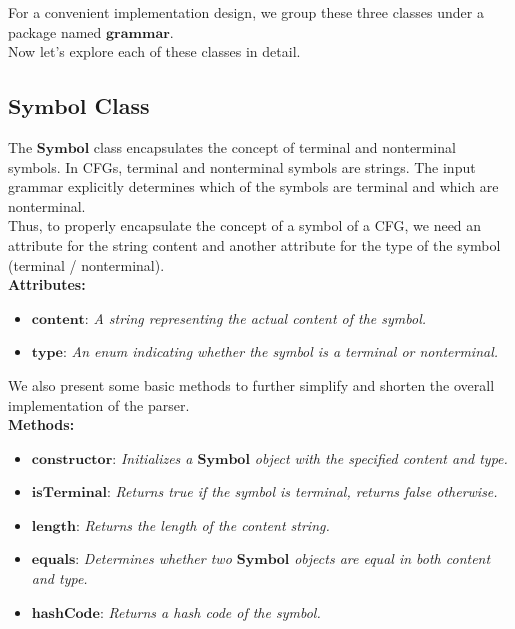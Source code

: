For a convenient implementation design, we group these three classes under a package named \(\boldsymbol{grammar}\).\\

Now let’s explore each of these classes in detail.

\subsection*{\(\boldsymbol{Symbol}\) Class}

The \(\boldsymbol{Symbol}\) class encapsulates the concept of terminal and nonterminal symbols. In CFGs, terminal and nonterminal symbols are strings. The input grammar explicitly determines which of the symbols are terminal and which are nonterminal.\\
Thus, to properly encapsulate the concept of a symbol of a CFG, we need an attribute for the string content and another attribute for the type of the symbol (terminal / nonterminal).\\

\textbf{Attributes:}
\begin{itemize}
    \item \(\boldsymbol{content}\): \textit{A string representing the actual content of the symbol.}
    \item \(\boldsymbol{type}\): \textit{An enum indicating whether the symbol is a terminal or nonterminal.}
\end{itemize}

We also present some basic methods to further simplify and shorten the overall implementation of the parser.\\

\textbf{Methods:}
\begin{itemize}
    \item \(\boldsymbol{constructor}\): \textit{Initializes a \(\boldsymbol{Symbol}\) object with the specified content and type.}
    \item \(\boldsymbol{isTerminal}\): \textit{Returns true if the symbol is terminal, returns false otherwise.}
    \item \(\boldsymbol{length}\): \textit{Returns the length of the content string.}
    \item \(\boldsymbol{equals}\): \textit{Determines whether two \(\boldsymbol{Symbol}\) objects are equal in both content and type.}
    \item \(\boldsymbol{hashCode}\): \textit{Returns a hash code of the symbol.}
\end{itemize}

